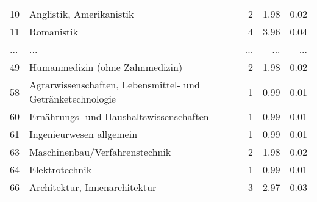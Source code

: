 \begin{longtable}{lXrrr}
        10 & \multicolumn{1}{X}{Anglistik, Amerikanistik} & %
          \num{2} &
          \num[round-mode=places,round-precision=2]{1,98} &
          \num[round-mode=places,round-precision=2]{0,02} \\
        11 & \multicolumn{1}{X}{Romanistik} & %
          \num{4} &
          \num[round-mode=places,round-precision=2]{3,96} &
          \num[round-mode=places,round-precision=2]{0,04} \\
       ... & ... & ... & ... & ... \\
        49 & \multicolumn{1}{X}{Humanmedizin (ohne Zahnmedizin)} & %
          \num{2} &
          \num[round-mode=places,round-precision=2]{1,98} &
          \num[round-mode=places,round-precision=2]{0,02} \\

        58 & \multicolumn{1}{X}{Agrarwissenschaften, Lebensmittel- und Getränketechnologie} & %
          \num{1} &
          \num[round-mode=places,round-precision=2]{0,99} &
          \num[round-mode=places,round-precision=2]{0,01} \\

        60 & \multicolumn{1}{X}{Ernährungs- und Haushaltswissenschaften} & %
          \num{1} &
          \num[round-mode=places,round-precision=2]{0,99} &
          \num[round-mode=places,round-precision=2]{0,01} \\

        61 & \multicolumn{1}{X}{Ingenieurwesen allgemein} & %
          \num{1} &
          \num[round-mode=places,round-precision=2]{0,99} &
          \num[round-mode=places,round-precision=2]{0,01} \\

        63 & \multicolumn{1}{X}{Maschinenbau/Verfahrenstechnik} & %
          \num{2} &
          \num[round-mode=places,round-precision=2]{1,98} &
          \num[round-mode=places,round-precision=2]{0,02} \\

        64 & \multicolumn{1}{X}{Elektrotechnik} & %
          \num{1} &
          \num[round-mode=places,round-precision=2]{0,99} &
          \num[round-mode=places,round-precision=2]{0,01} \\

        66 & \multicolumn{1}{X}{Architektur, Innenarchitektur} & %
          \num{3} &
          \num[round-mode=places,round-precision=2]{2,97} &
          \num[round-mode=places,round-precision=2]{0,03} \\


\end{longtable}

